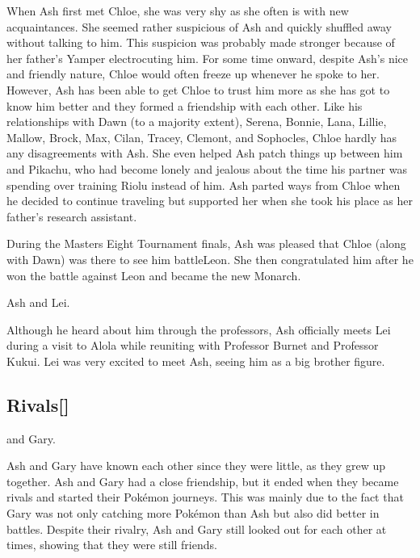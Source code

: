 \documentclass[a4paper,12pt]{article}
\begin{document}
When Ash first met Chloe, she was very shy as she often is with new acquaintances. She seemed rather suspicious of Ash and quickly shuffled away without talking to him. This suspicion was probably made stronger because of her father's Yamper electrocuting him. For some time onward, despite Ash's nice and friendly nature, Chloe would often freeze up whenever he spoke to her. However, Ash has been able to get Chloe to trust him more as she has got to know him better and they formed a friendship with each other. Like his relationships with Dawn (to a majority extent), Serena, Bonnie, Lana, Lillie, Mallow, Brock, Max, Cilan, Tracey, Clemont, and Sophocles, Chloe hardly has any disagreements with Ash. She even helped Ash patch things up between him and Pikachu, who had become lonely and jealous about the time his partner was spending over training Riolu instead of him. Ash parted ways from Chloe when he decided to continue traveling but supported her when she took his place as her father's research assistant.\\ \par \vspace{0.5cm}

During the Masters Eight Tournament finals, Ash was pleased that Chloe (along with Dawn) was there to see him battleLeon. She then congratulated him after he won the battle against Leon and became the new Monarch.\\ \par \vspace{0.5cm}

Ash and Lei.\\ \par \vspace{0.5cm}

Although he heard about him through the professors, Ash officially meets Lei during a visit to Alola while reuniting with Professor Burnet and Professor Kukui. Lei was very excited to meet Ash, seeing him as a big brother figure.\\ \par \vspace{0.5cm}

\subsection*{Rivals[]}\n\nAsh and Gary.\\ \par \vspace{0.5cm}

Ash and Gary have known each other since they were little, as they grew up together. Ash and Gary had a close friendship, but it ended when they became rivals and started their Pokémon journeys. This was mainly due to the fact that Gary was not only catching more Pokémon than Ash but also did better in battles. Despite their rivalry, Ash and Gary still looked out for each other at times, showing that they were still friends.\\ \par \vspace{0.5cm}
\end{document}
